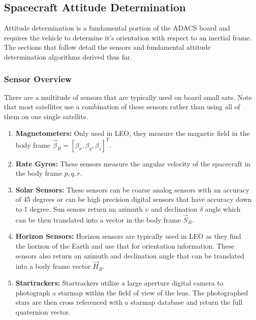 \documentclass{article}
\begin{document}
\subsection{Spacecraft Attitude Determination}

Attitude determination is a fundamental portion of the ADACS board and
requires the vehicle to determine it's orientation with respect to an
inertial frame. The sections that follow detail the sensors and
fundamental attitude determination algorithms derived thus far. 

\subsubsection{Sensor Overview}

There are a multitude of sensors that are typically used on board
small sats. Note that most satellites use a combination of these
sensors rather than using all of them on one single satellite.

\begin{enumerate}[itemsep=-5pt]
  \item {\bf Magnetometers:} Only used in LEO, they measure the
    magnetic field in the body frame $\vec{\beta}_B = [\beta_x,\beta_y,\beta_z]^T$.
    \item {\bf Rate Gyros:} These sensors measure the angular velocity
      of the spacecraft in the body frame $p,q,r$.
    \item {\bf Solar Sensors:} These sensors can be coarse analog
      sensors with an accuracy of 45 degrees or can be high precision
      digital sensors that have accuracy down to 1 degree. Sun senors
      return an azimuth $\upsilon$ and declination $\delta$ angle which can be then
      translated into a vector in the body frame $\vec{S}_B$.
    \item {\bf Horizon Sensors:} Horizon sensors are typically used in
      LEO as they find the horizon of the Earth and use that for
      orientation information. These sensors also return an azimuth
      and declination angle that can be translated into a body frame
      vector $\vec{H}_B$.
      \item {\bf Startrackers:} Startrackers utilize a large aperture
        digital camera to photograph a starmap within the field of
        view of the lens. The photographed stars are then cross
        referenced with a starmap database and return the full
        quaternion vector.
\end{enumerate}
\end{document}
